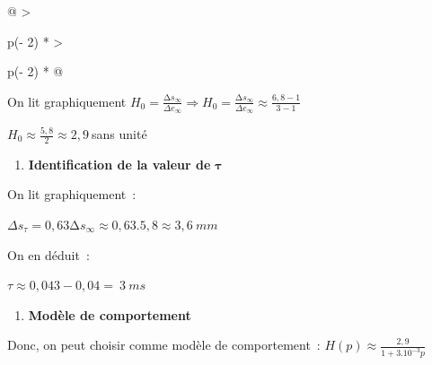 \begin{longtable}[]{@{}
  >{\raggedright\arraybackslash}p{(\columnwidth - 2\tabcolsep) * }
  >{\raggedright\arraybackslash}p{(\columnwidth - 2\tabcolsep) * }@{}}
\begin{minipage}[b]{\linewidth}
On lit graphiquement \(H_{0} = \frac{{\mathrm{\Delta}s}_{\infty}}{\Delta e_{\infty}} \Longrightarrow H_{0} = \frac{{\mathrm{\Delta}s}_{\infty}}{\Delta e_{\infty}} \approx \frac{6,8 - 1}{3 - 1}\)

\(H_{0} \approx \frac{5,8}{2} \approx 2,9\ \)sans unité

\begin{enumerate}
\def\labelenumi{\arabic{enumi}.}
\setcounter{enumi}{2}
\item
  \textbf{Identification de la valeur de} \(\mathbf{\tau}\)
\end{enumerate}

On lit graphiquement~:

\(\Delta s_{\tau} = 0,63{\mathrm{\Delta}s}_{\infty} \approx 0,63.5,8 \approx 3,6\ mm\)

On en déduit~:

\(\tau \approx 0,043 - 0,04 = \ 3\ ms\)

\begin{enumerate}
\def\labelenumi{\arabic{enumi}.}
\setcounter{enumi}{3}
\item
  \textbf{Modèle de comportement}
\end{enumerate}

Donc, on peut choisir comme modèle de comportement~: \(H(p) \approx \frac{2,9}{1 + 3.10^{- 3}p}\)\strut
\end{minipage} \\
\midrule\noalign{}
\endhead
\bottomrule\noalign{}
\endlastfoot
\end{longtable}

